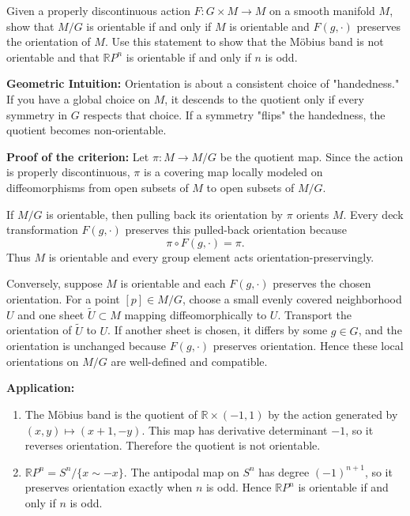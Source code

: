 \begin{exercise}
\label{geometry:2014:8}
Given a properly discontinuous action $F : G \times M \to M$ on a smooth manifold $M$, show that $M/G$ is orientable if and only if $M$ is orientable and $F(g, \cdot)$ preserves the orientation of $M$. Use this statement to show that the Möbius band is not orientable and that $\mathbb{R}P^{n}$ is orientable if and only if $n$ is odd.
\end{exercise}

\begin{solution}
\textbf{Geometric Intuition:} Orientation is about a consistent choice of "handedness." If you have a global choice on $M$, it descends to the quotient only if every symmetry in $G$ respects that choice. If a symmetry "flips" the handedness, the quotient becomes non-orientable.

\textbf{Proof of the criterion:}
Let $\pi:M\to M/G$ be the quotient map. Since the action is properly discontinuous, $\pi$ is a covering map locally modeled on diffeomorphisms from open subsets of $M$ to open subsets of $M/G$.

If $M/G$ is orientable, then pulling back its orientation by $\pi$ orients $M$. Every deck transformation $F(g,\cdot)$ preserves this pulled-back orientation because
\[
\pi\circ F(g,\cdot)=\pi.
\]
Thus $M$ is orientable and every group element acts orientation-preservingly.

Conversely, suppose $M$ is orientable and each $F(g,\cdot)$ preserves the chosen orientation. For a point $[p]\in M/G$, choose a small evenly covered neighborhood $U$ and one sheet $\widetilde U\subset M$ mapping diffeomorphically to $U$. Transport the orientation of $\widetilde U$ to $U$. If another sheet is chosen, it differs by some $g\in G$, and the orientation is unchanged because $F(g,\cdot)$ preserves orientation. Hence these local orientations on $M/G$ are well-defined and compatible.

\textbf{Application:}
\begin{enumerate}
    \item The Möbius band is the quotient of $\mathbb{R}\times (-1,1)$ by the action generated by $(x,y)\mapsto (x+1,-y)$. This map has derivative determinant $-1$, so it reverses orientation. Therefore the quotient is not orientable.
    \item $\mathbb{R}P^n=S^n/\{x\sim -x\}$. The antipodal map on $S^n$ has degree $(-1)^{n+1}$, so it preserves orientation exactly when $n$ is odd. Hence $\mathbb{R}P^n$ is orientable if and only if $n$ is odd.
\end{enumerate}
\end{solution}

